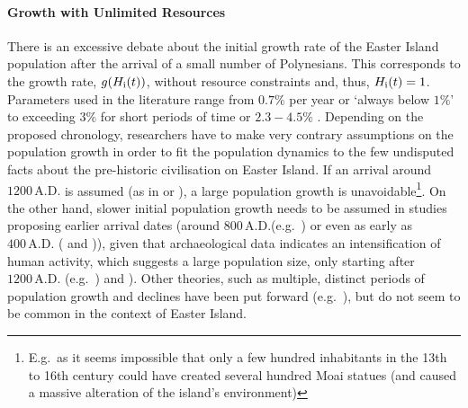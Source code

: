 \paragraph{Growth with Unlimited Resources}
There is an excessive debate about the initial growth rate of the Easter Island population after the arrival of a small number of Polynesians.
This corresponds to the growth rate, $g(H_{\rm i}(t))$, without resource constraints and, thus, $H_{\rm i}(t)=1$.
Parameters used in the literature range from $0.7\%$ per year \citep{Bahn2017} or `always below $1\%$' \citep{Brander1998} to exceeding $3\%$ \citep{Hunt2007} for short periods of time or $2.3-4.5\%$ \citep{Brandt2015}.
Depending on the proposed chronology, researchers have to make very contrary assumptions on the population growth in order to fit the population dynamics to the few undisputed facts about the pre-historic civilisation on Easter Island. 
If an arrival around $1200\, \text{A.D.}$ is assumed (as in \citet{Hunt2007} or \citet{Brandt2015}), a large population growth is unavoidable\footnote{E.g.\ as it seems impossible that only a few hundred inhabitants in the 13th to 16th century could have created several hundred Moai statues (and caused a massive alteration of the island's environment)}.
On the other hand, slower initial population growth needs to be assumed in studies proposing earlier arrival dates (around $800\, \text{A.D.}$(e.g.\ \citet{Bahn2017}) or even as early as $400\, \text{A.D.}$ (\citet{Good2006} and \citet{Brander1998})), given that archaeological data indicates an intensification of human activity, which suggests a large population size, only starting after $1200\, \text{A.D.}$ (e.g.\ \citet{Bahn2017}) and \citet{Hunt2007}).
Other theories, such as multiple, distinct periods of population growth and declines have been put forward (e.g.\ \citet{Cole2008}), but do not seem to be common in the context of Easter Island.
